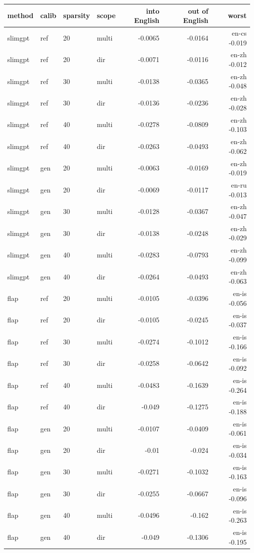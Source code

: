 \begin{tabular}{llllrrr}
\toprule
method & calib & sparsity & scope & into English & out of English & worst \\
\midrule
slimgpt & ref & 20 & multi & -0.0065 & -0.0164 & en-cs -0.019 \\
slimgpt & ref & 20 & dir & -0.0071 & -0.0116 & en-zh -0.012 \\
slimgpt & ref & 30 & multi & -0.0138 & -0.0365 & en-zh -0.048 \\
slimgpt & ref & 30 & dir & -0.0136 & -0.0236 & en-zh -0.028 \\
slimgpt & ref & 40 & multi & -0.0278 & -0.0809 & en-zh -0.103 \\
slimgpt & ref & 40 & dir & -0.0263 & -0.0493 & en-zh -0.062 \\
slimgpt & gen & 20 & multi & -0.0063 & -0.0169 & en-zh -0.019 \\
slimgpt & gen & 20 & dir & -0.0069 & -0.0117 & en-ru -0.013 \\
slimgpt & gen & 30 & multi & -0.0128 & -0.0367 & en-zh -0.047 \\
slimgpt & gen & 30 & dir & -0.0138 & -0.0248 & en-zh -0.029 \\
slimgpt & gen & 40 & multi & -0.0283 & -0.0793 & en-zh -0.099 \\
slimgpt & gen & 40 & dir & -0.0264 & -0.0493 & en-zh -0.063 \\
flap & ref & 20 & multi & -0.0105 & -0.0396 & en-is -0.056 \\
flap & ref & 20 & dir & -0.0105 & -0.0245 & en-is -0.037 \\
flap & ref & 30 & multi & -0.0274 & -0.1012 & en-is -0.166 \\
flap & ref & 30 & dir & -0.0258 & -0.0642 & en-is -0.092 \\
flap & ref & 40 & multi & -0.0483 & -0.1639 & en-is -0.264 \\
flap & ref & 40 & dir & -0.049 & -0.1275 & en-is -0.188 \\
flap & gen & 20 & multi & -0.0107 & -0.0409 & en-is -0.061 \\
flap & gen & 20 & dir & -0.01 & -0.024 & en-is -0.034 \\
flap & gen & 30 & multi & -0.0271 & -0.1032 & en-is -0.163 \\
flap & gen & 30 & dir & -0.0255 & -0.0667 & en-is -0.096 \\
flap & gen & 40 & multi & -0.0496 & -0.162 & en-is -0.263 \\
flap & gen & 40 & dir & -0.049 & -0.1306 & en-is -0.195 \\
\bottomrule
\end{tabular}
